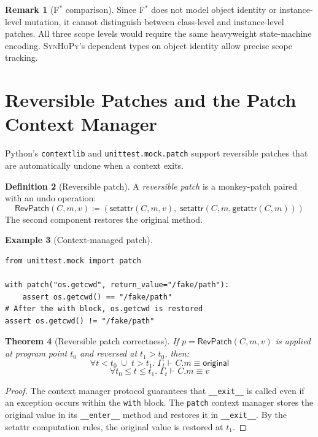 \documentclass[11pt,a4paper]{report}
\theoremstyle{definition}
\newtheorem{definition}{Definition}[chapter]
\newtheorem{example}[definition]{Example}
\newtheorem{remark}[definition]{Remark}
\theoremstyle{plain}
\newtheorem{theorem}[definition]{Theorem}
\newcommand{\defeq}{\coloneqq}
\newcommand{\fstar}{F$^{*}$}
\newcommand{\synhopy}{\textsc{SynHoPy}}
\begin{document}
\begin{remark}[\fstar{} comparison]
Since \fstar{} does not model object identity or instance-level mutation, it
cannot distinguish between class-level and instance-level patches. All three
scope levels would require the same heavyweight state-machine encoding.
\synhopy{}'s dependent types on object identity allow precise scope tracking.
\end{remark}


\section{Reversible Patches and the Patch Context Manager}
\label{sec:reversible-patch}

Python's \texttt{contextlib} and \texttt{unittest.mock.patch} support
reversible patches that are automatically undone when a context exits.

\begin{definition}[Reversible patch]
A \emph{reversible patch} is a monkey-patch paired with an undo operation:
\[
  \mathsf{RevPatch}(C, m, v) \defeq
  \left(\mathsf{setattr}(C, m, v),\;
        \mathsf{setattr}(C, m, \mathsf{getattr}(C, m))\right)
\]
The second component restores the original method.
\end{definition}

\begin{example}[Context-managed patch]
\begin{lstlisting}[style=python]
from unittest.mock import patch

with patch("os.getcwd", return_value="/fake/path"):
    assert os.getcwd() == "/fake/path"
# After the with block, os.getcwd is restored
assert os.getcwd() != "/fake/path"
\end{lstlisting}
\end{example}

\begin{theorem}[Reversible patch correctness]
\label{thm:rev-patch}
If $p = \mathsf{RevPatch}(C, m, v)$ is applied at program point $t_0$ and
reversed at $t_1 > t_0$, then:
\[
  \forall t < t_0 \;\cup\; t > t_1.\;
  \Gamma_t \vdash C.m \equiv \mathsf{original}
\]
\[
  \forall t_0 \leq t \leq t_1.\;
  \Gamma_t \vdash C.m \equiv v
\]
\end{theorem}
\begin{proof}
The context manager protocol guarantees that \lstinline[style=python]|__exit__|
is called even if an exception occurs within the \texttt{with} block. The
\texttt{patch} context manager stores the original value in its
\lstinline[style=python]|__enter__| method and restores it in
\lstinline[style=python]|__exit__|. By the setattr computation rules,
the original value is restored at $t_1$.
\end{proof}
\end{document}
